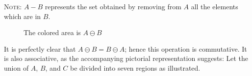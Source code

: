 \documentclass[twoside]{amsart}
\begin{document}
\begin{enumerate}[A.]
   \textsc{Note}: $A - B$ represents the set obtained by removing from
   $A$ all the elements which are in $B$.

   \begin{figure}[ht]
      \caption{The colored area is $A \ominus B$}
      \label{fig:symmdif}
   \end{figure}

   It is perfectly clear that $A \ominus B = B \ominus A$; hence this 
   operation is commutative. It is also associative, as the accompanying
   pictorial representation suggests: Let the union of $A$, $B$, and
   $C$ be divided into seven regions as illustrated.

   \begin{figure}[ht]
   \end{figure}


\end{enumerate}
\end{document}
